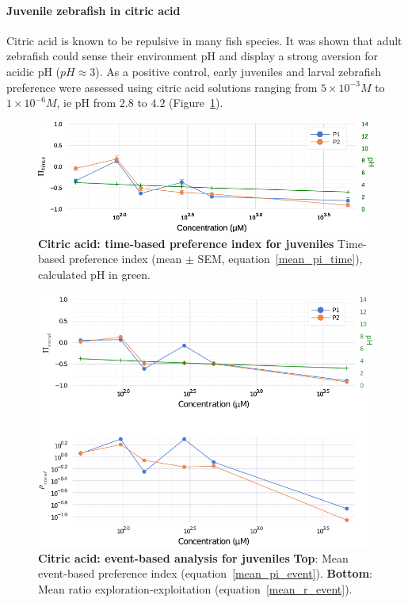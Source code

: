   \paragraph{Juvenile zebrafish in citric acid}
  Citric acid is known to be repulsive in many fish species. It was shown that adult zebrafish could sense their environment pH \cite{abreu2016acute,abreu2016behavioral} and display a strong aversion for acidic pH ($pH \approx 3$). As a positive control, early juveniles and larval zebrafish preference were assessed using citric acid solutions ranging from $5 \times 10^{-3} M$ to $1 \times 10^{-6} M$, ie pH from $2.8$ to $4.2$ (Figure~\ref{citric_acid}).
    \begin{figure}[h!]
      \centering
      \includegraphics[width=1\textwidth]{part_2/assets/citricacid.png}
      \caption{\textbf{Citric acid: time-based preference index for juveniles} Time-based preference index (mean $\pm$ SEM, equation~\ref{mean_pi_time}), calculated pH in green.}
      \label{citric_acid}
    \end{figure}
    \begin{figure}[h!]
      \centering
      \includegraphics[width=1\textwidth]{part_2/assets/citricacid_event.png}
      \caption{\textbf{Citric acid: event-based analysis for juveniles} \textbf{Top}: Mean event-based preference index (equation~\ref{mean_pi_event}). \textbf{Bottom}: Mean ratio exploration-exploitation (equation~\ref{mean_r_event}).}
      \label{citric_acid_event}
    \end{figure}

